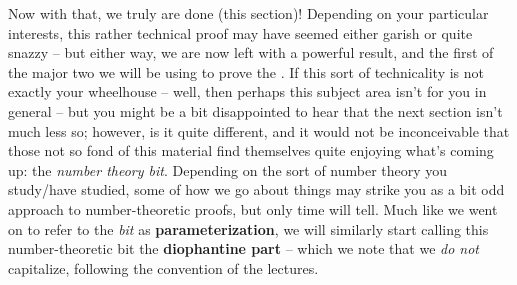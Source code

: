   Now with that, we truly are done (this section)! Depending on your particular interests, this rather technical proof may have seemed either garish or quite snazzy -- but either way, we are now left with a powerful result, and the first of the major two we will be using to prove the \pwt. If this sort of technicality is not exactly your wheelhouse -- well, then perhaps this subject area isn't for you in general -- but you might be a bit disappointed to hear that the next section isn't much less so; however, is it quite different, and it would not be inconceivable that those not so fond of this material find themselves quite enjoying what's coming up: the \emph{number theory bit}. Depending on the sort of number theory you study/have studied, some of how we go about things may strike you as a bit odd approach to number-theoretic proofs, but only time will tell. Much like we went on to refer to the \emph{\om bit} as \textbf{parameterization}, we will similarly start calling this number-theoretic bit the \textbf{diophantine part} -- which we note that we \emph{do not} capitalize, following the convention of the lectures.
